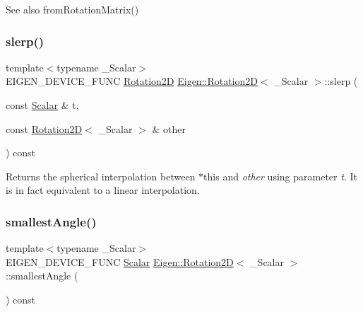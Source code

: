 \begin{DoxySeeAlso}{See also}
from\+Rotation\+Matrix() 
\end{DoxySeeAlso}
\mbox{\label{class_eigen_1_1_rotation2_d_a47058d6327b801f6987506dcfbffb77f}} 
\subsubsection{\texorpdfstring{slerp()}{slerp()}}
{\footnotesize\ttfamily template$<$typename \+\_\+\+Scalar$>$ \\
E\+I\+G\+E\+N\+\_\+\+D\+E\+V\+I\+C\+E\+\_\+\+F\+U\+NC \mbox{\hyperlink{class_eigen_1_1_rotation2_d}{Rotation2D}} \mbox{\hyperlink{class_eigen_1_1_rotation2_d}{Eigen\+::\+Rotation2D}}$<$ \+\_\+\+Scalar $>$\+::slerp (\begin{DoxyParamCaption}\item[{const \mbox{\hyperlink{class_eigen_1_1_rotation2_d_ac20c665ece0f197a712a2a39ae72e4e4}{Scalar}} \&}]{t,  }\item[{const \mbox{\hyperlink{class_eigen_1_1_rotation2_d}{Rotation2D}}$<$ \+\_\+\+Scalar $>$ \&}]{other }\end{DoxyParamCaption}) const\hspace{0.3cm}{\ttfamily [inline]}}

\begin{DoxyReturn}{Returns}
the spherical interpolation between {\ttfamily $\ast$this} and {\itshape other} using parameter {\itshape t}. It is in fact equivalent to a linear interpolation. 
\end{DoxyReturn}
\mbox{\label{class_eigen_1_1_rotation2_d_a38e64a85197dc268a3e7832e75e469c7}} 
\subsubsection{\texorpdfstring{smallestAngle()}{smallestAngle()}}
{\footnotesize\ttfamily template$<$typename \+\_\+\+Scalar$>$ \\
E\+I\+G\+E\+N\+\_\+\+D\+E\+V\+I\+C\+E\+\_\+\+F\+U\+NC \mbox{\hyperlink{class_eigen_1_1_rotation2_d_ac20c665ece0f197a712a2a39ae72e4e4}{Scalar}} \mbox{\hyperlink{class_eigen_1_1_rotation2_d}{Eigen\+::\+Rotation2D}}$<$ \+\_\+\+Scalar $>$\+::smallest\+Angle (\begin{DoxyParamCaption}{ }\end{DoxyParamCaption}) const\hspace{0.3cm}{\ttfamily [inline]}}

